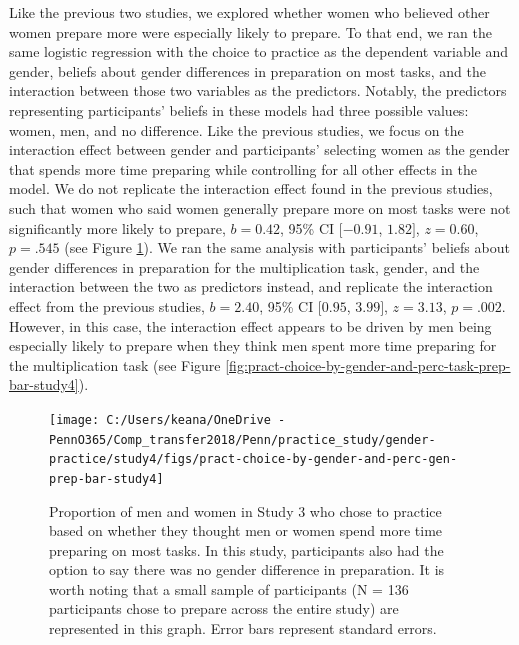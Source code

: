 \documentclass[a4paper, nobind]{templates/ociamthesis}
\begin{document}
Like the previous two studies, we explored whether women who believed other women prepare more were especially likely to prepare. To that end, we ran the same logistic regression with the choice to practice as the dependent variable and gender, beliefs about gender differences in preparation on most tasks, and the interaction between those two variables as the predictors. Notably, the predictors representing participants' beliefs in these models had three possible values: women, men, and no difference. Like the previous studies, we focus on the interaction effect between gender and participants' selecting women as the gender that spends more time preparing while controlling for all other effects in the model. We do not replicate the interaction effect found in the previous studies, such that women who said women generally prepare more on most tasks were not significantly more likely to prepare, \(b = 0.42\), 95\% CI \([-0.91\), \(1.82]\), \(z = 0.60\), \(p = .545\) (see Figure \ref{fig:pract-choice-by-gender-and-perc-gen-prep-bar-study4}). We ran the same analysis with participants' beliefs about gender differences in preparation for the multiplication task, gender, and the interaction between the two as predictors instead, and replicate the interaction effect from the previous studies, \(b = 2.40\), 95\% CI \([0.95\), \(3.99]\), \(z = 3.13\), \(p = .002\). However, in this case, the interaction effect appears to be driven by men being especially likely to prepare when they think men spent more time preparing for the multiplication task (see Figure \ref{fig:pract-choice-by-gender-and-perc-task-prep-bar-study4}).

\begin{figure}

{\centering \texttt{[image: C:/Users/keana/OneDrive - PennO365/Comp\_transfer2018/Penn/practice\_study/gender-practice/study4/figs/pract-choice-by-gender-and-perc-gen-prep-bar-study4]} 

}

\caption{Proportion of men and women in Study 3 who chose to practice based on whether they thought men or women spend more time preparing on most tasks. In this study, participants also had the option to say there was no gender difference in preparation. It is worth noting that a small sample of participants (N = 136 participants chose to prepare across the entire study) are represented in this graph. Error bars represent standard errors.}\label{fig:pract-choice-by-gender-and-perc-gen-prep-bar-study4}
\end{figure}
\end{document}
